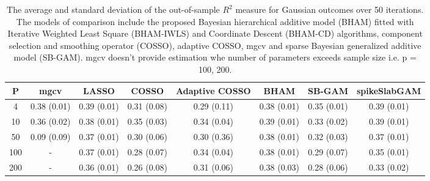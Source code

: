 \begin{table}[ht]
\centering
\begin{tabular}{cccccccc}
  \hline
P & mgcv & LASSO & COSSO & Adaptive COSSO & BHAM & SB-GAM & spikeSlabGAM \\ 
  \hline
  4 & 0.38 (0.01) & 0.39 (0.01) & 0.31 (0.08) & 0.29 (0.11) & 0.38 (0.01) & 0.35 (0.01) & 0.39 (0.01) \\ 
   10 & 0.36 (0.02) & 0.38 (0.01) & 0.35 (0.03) & 0.34 (0.04) & 0.39 (0.01) & 0.33 (0.02) & 0.39 (0.01) \\ 
   50 & 0.09 (0.09) & 0.37 (0.01) & 0.30 (0.06) & 0.30 (0.36) & 0.38 (0.01) & 0.32 (0.03) & 0.37 (0.01) \\ 
  100 & - & 0.37 (0.01) & 0.28 (0.07) & 0.34 (0.04) & 0.38 (0.01) & 0.29 (0.07) & 0.35 (0.01) \\ 
  200 & - & 0.36 (0.01) & 0.26 (0.08) & 0.31 (0.06) & 0.38 (0.03) & 0.28 (0.06) & 0.33 (0.02) \\ 
   \hline
\end{tabular}
\caption{The average and standard deviation of the out-of-sample $R^2$ measure for
    Gaussian outcomes over 50 iterations. The models of comparison include the proposed Bayesian
    hierarchical additive model (BHAM) fitted with Iterative Weighted Least Square (BHAM-IWLS) and
    Coordinate Descent (BHAM-CD) algorithms, component selection and smoothing operator (COSSO), adaptive
    COSSO, mgcv and sparse Bayesian generalized additive model (SB-GAM). mgcv doesn't provide estimation
    whe number of parameters exceeds sample size i.e. p = 100, 200.} 
\label{tab:lnr_gaus}
\end{table}
